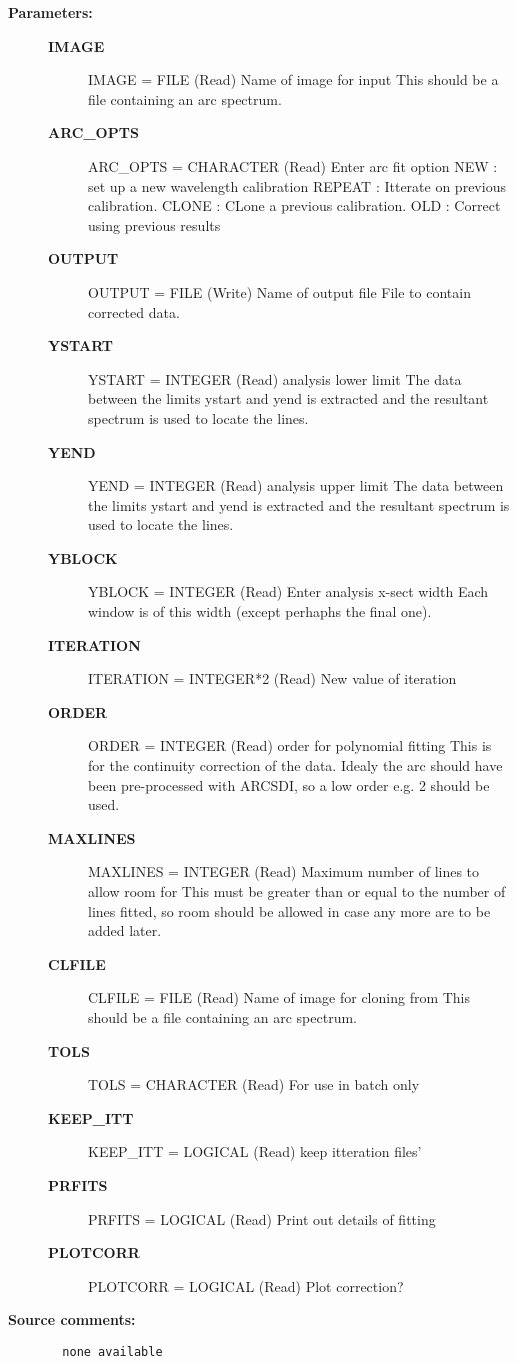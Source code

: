 \begin{description}
\item [{\bf Parameters:}]
\begin{description}
\item [{\bf IMAGE}]
    IMAGE = FILE (Read)
        Name of image for input
          This should be a file containing an arc spectrum.
\item [{\bf ARC_OPTS}]
    ARC_OPTS = CHARACTER (Read)
        Enter arc fit option
          NEW    : set up a new wavelength calibration
          REPEAT : Itterate on previous calibration.
          CLONE  : CLone a previous calibration.
          OLD    : Correct using previous results
\item [{\bf OUTPUT}]
    OUTPUT = FILE (Write)
        Name of output file
           File to contain corrected data.
\item [{\bf YSTART}]
    YSTART = INTEGER (Read)
        analysis lower limit
            The data between the limits ystart and yend is extracted
            and the resultant spectrum is used to locate the lines.
\item [{\bf YEND}]
    YEND = INTEGER (Read)
        analysis upper limit
            The data between the limits ystart and yend is extracted
            and the resultant spectrum is used to locate the lines.
\item [{\bf YBLOCK}]
    YBLOCK = INTEGER (Read)
        Enter analysis x-sect width
            Each window is of this width (except perhaphs the final one).
\item [{\bf ITERATION}]
    ITERATION = INTEGER*2 (Read)
        New value of iteration
\item [{\bf ORDER}]
    ORDER = INTEGER (Read)
        order for polynomial fitting
          This is for the continuity correction of the data. Idealy the
          arc should have been pre-processed with ARCSDI, so a low
          order e.g. 2 should be used.
\item [{\bf MAXLINES}]
    MAXLINES = INTEGER (Read)
        Maximum number of lines to allow room for
          This must be greater than or equal to the number of lines
          fitted, so room should be allowed in case any more are
          to be added later.
\item [{\bf CLFILE}]
    CLFILE = FILE (Read)
        Name of image for cloning from
          This should be a file containing an arc spectrum.
\item [{\bf TOLS}]
    TOLS = CHARACTER (Read)
        For use in batch only
\item [{\bf KEEP_ITT}]
    KEEP_ITT = LOGICAL (Read)
        keep itteration files'
\item [{\bf PRFITS}]
    PRFITS = LOGICAL (Read)
        Print out details of fitting
\item [{\bf PLOTCORR}]
    PLOTCORR = LOGICAL (Read)
        Plot correction?
\end{description}

\item [{\bf Source comments:}]
\begin{verbatim}
  none available

\end{verbatim}
\end{description}

